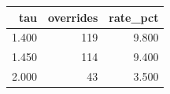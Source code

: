 \begin{tabular}{rrr}
\toprule
tau & overrides & rate_pct \\
\midrule
1.400 & 119 & 9.800 \\
1.450 & 114 & 9.400 \\
2.000 & 43 & 3.500 \\
\bottomrule
\end{tabular}
